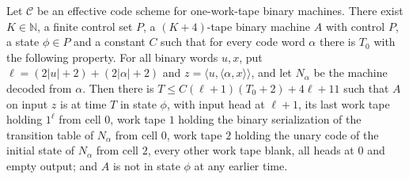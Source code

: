 \begin{theorem}
\label{Complexity.f6_prefix}
\leanok
{}
Let $\mathcal{C}$ be an effective code scheme for one-work-tape binary machines. There exist
$K\in\mathbb{N}$, a finite control set $P$, a $(K+4)$-tape binary machine $A$ with control $P$, a
state $\phi\in P$ and a constant $C$ such that for every code word $\alpha$ there is $T_0$ with the
following property. For all binary words $u,x$, put $\ell=(2|u|+2)+(2|\alpha|+2)$ and
$z=\langle u,\langle\alpha,x\rangle\rangle$, and let $N_\alpha$ be the machine decoded from
$\alpha$. Then there is $T\le C(\ell+1)(T_0+2)+4\ell+11$ such that $A$ on input $z$ is at time $T$
in state $\phi$, with input head at $\ell+1$, its last work tape holding $1^\ell$ from cell $0$,
work tape $1$ holding the binary serialization of the transition table of $N_\alpha$ from cell $0$,
work tape $2$ holding the unary code of the initial state of $N_\alpha$ from cell $2$, every other
work tape blank, all heads at $0$ and empty output; and $A$ is not in state $\phi$ at any earlier
time.
\end{theorem}


